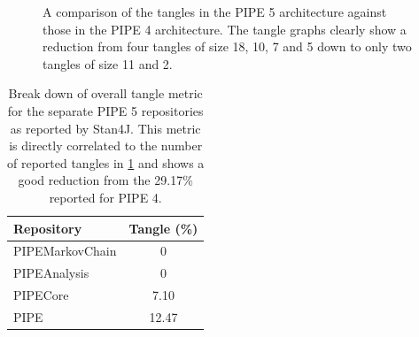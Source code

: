 \begin{figure}[tbp]
\begin{center}
{}
\caption{A comparison of the tangles in the PIPE 5 architecture against those in the PIPE 4 architecture. The tangle graphs clearly show a reduction from four tangles of size 18, 10, 7 and 5 down to only two tangles of size 11 and 2.}
\label{fig:tangle_results}
\end{center}
\end{figure}

\begin{table}[tb]
\small
\begin{center}
  \begin{tabular}{| l | c |}
    \hline
    Repository & Tangle (\%) \\ 
    \hline
    PIPEMarkovChain & 0 \\ 
    \hline
    PIPEAnalysis & 0 \\    
    \hline
    PIPECore & 7.10\\
    \hline
    PIPE & 12.47\\
    \hline

  \end{tabular}
\caption{Break down of overall tangle metric for the separate PIPE 5 repositories as reported by Stan4J. This metric is directly correlated to the number of reported tangles in \cref{fig:tangle_results} and shows a good reduction from the 29.17\% reported for PIPE 4. }
\label{tbl:tangle_results}
\end{center}
\end{table}
